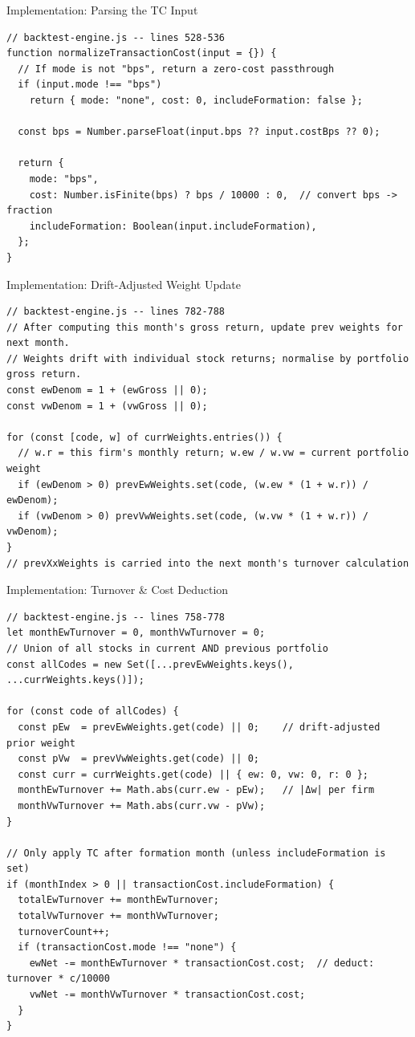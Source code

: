 \documentclass[aspectratio=169, 12pt]{beamer}
\begin{document}
\begin{frame}[fragile]{Implementation: Parsing the TC Input}
\begin{lstlisting}[style=jscode]
// backtest-engine.js -- lines 528-536
function normalizeTransactionCost(input = {}) {
  // If mode is not "bps", return a zero-cost passthrough
  if (input.mode !== "bps")
    return { mode: "none", cost: 0, includeFormation: false };

  const bps = Number.parseFloat(input.bps ?? input.costBps ?? 0);

  return {
    mode: "bps",
    cost: Number.isFinite(bps) ? bps / 10000 : 0,  // convert bps -> fraction
    includeFormation: Boolean(input.includeFormation),
  };
}
\end{lstlisting}
\end{frame}

\begin{frame}[fragile]{Implementation: Drift-Adjusted Weight Update}
\begin{lstlisting}[style=jscode]
// backtest-engine.js -- lines 782-788
// After computing this month's gross return, update prev weights for next month.
// Weights drift with individual stock returns; normalise by portfolio gross return.
const ewDenom = 1 + (ewGross || 0);
const vwDenom = 1 + (vwGross || 0);

for (const [code, w] of currWeights.entries()) {
  // w.r = this firm's monthly return; w.ew / w.vw = current portfolio weight
  if (ewDenom > 0) prevEwWeights.set(code, (w.ew * (1 + w.r)) / ewDenom);
  if (vwDenom > 0) prevVwWeights.set(code, (w.vw * (1 + w.r)) / vwDenom);
}
// prevXxWeights is carried into the next month's turnover calculation
\end{lstlisting}
\end{frame}

\begin{frame}[fragile]{Implementation: Turnover \& Cost Deduction}
\begin{lstlisting}[style=jscode]
// backtest-engine.js -- lines 758-778
let monthEwTurnover = 0, monthVwTurnover = 0;
// Union of all stocks in current AND previous portfolio
const allCodes = new Set([...prevEwWeights.keys(), ...currWeights.keys()]);

for (const code of allCodes) {
  const pEw  = prevEwWeights.get(code) || 0;    // drift-adjusted prior weight
  const pVw  = prevVwWeights.get(code) || 0;
  const curr = currWeights.get(code) || { ew: 0, vw: 0, r: 0 };
  monthEwTurnover += Math.abs(curr.ew - pEw);   // |Δw| per firm
  monthVwTurnover += Math.abs(curr.vw - pVw);
}

// Only apply TC after formation month (unless includeFormation is set)
if (monthIndex > 0 || transactionCost.includeFormation) {
  totalEwTurnover += monthEwTurnover;
  totalVwTurnover += monthVwTurnover;
  turnoverCount++;
  if (transactionCost.mode !== "none") {
    ewNet -= monthEwTurnover * transactionCost.cost;  // deduct: turnover * c/10000
    vwNet -= monthVwTurnover * transactionCost.cost;
  }
}
\end{lstlisting}
\end{frame}
\end{document}
